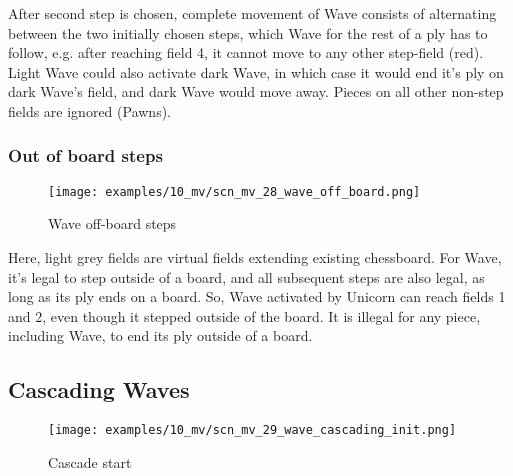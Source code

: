 After second step is chosen, complete movement of Wave consists of alternating between the two initially
chosen steps, which Wave for the rest of a ply has to follow, e.g. after reaching field 4, it cannot move
to any other step-field (red). Light Wave could also activate dark Wave, in which case it would end it's
ply on dark Wave's field, and dark Wave would move away. Pieces on all other non-step fields are ignored
(Pawns).

\clearpage %

\subsubsection*{Out of board steps}
\label{sec:Miranda's veil/Wave/Movement/Out of board steps}

\vspace*{-1.4\baselineskip}
\noindent
\begin{figure}[!h]
\texttt{[image: examples/10\_mv/scn\_mv\_28\_wave\_off\_board.png]}
\caption{Wave off-board steps}
\label{fig:scn_mv_28_wave_off_board}
\end{figure}

Here, light grey fields are virtual fields extending existing chessboard.
For Wave, it's legal to step outside of a board, and all subsequent steps
are also legal, as long as its ply ends on a board. So, Wave activated by
Unicorn can reach fields 1 and 2, even though it stepped outside of the
board. It is illegal for any piece, including Wave, to end its ply outside
of a board.

\clearpage %

\subsection*{Cascading Waves}
\label{sec:Miranda's veil/Wave/Cascading Waves}

\vspace*{-1.4\baselineskip}
\noindent
\begin{figure}[h]
\texttt{[image: examples/10\_mv/scn\_mv\_29\_wave\_cascading\_init.png]}
\caption{Cascade start}
\label{fig:scn_mv_29_wave_cascading_init}
\end{figure}

